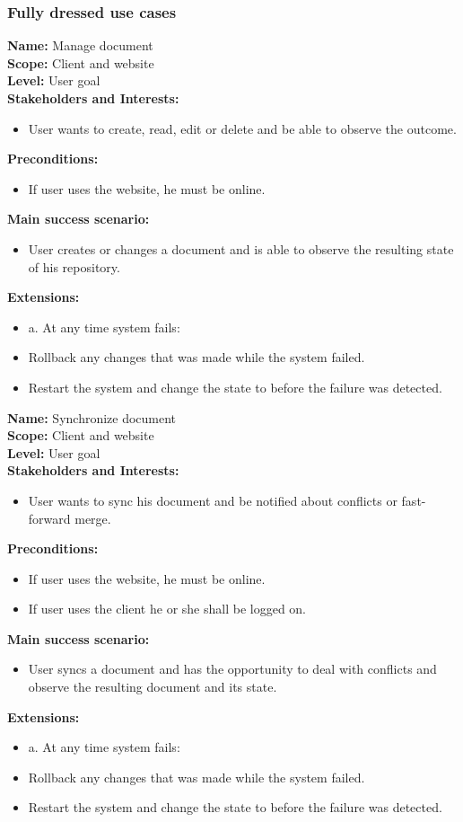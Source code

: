 \documentclass[a4paper,11pt,report]{report}
\begin{document}
	\subsubsection{Fully dressed use cases}
\textbf{Name:} Manage document \\
\textbf{Scope:} Client and website \\
\textbf{Level:} User goal \\
\textbf{Stakeholders and Interests:}
\begin{itemize}
	\item User wants to create, read, edit or delete and be able to observe the outcome.
\end{itemize} 
\textbf{Preconditions:}
\begin{itemize}
	\item If user uses the website, he must be online.
\end{itemize} 
\textbf{Main success scenario:}
\begin{itemize}
	\item User creates or changes a document and is able to observe the resulting state of his repository.
\end{itemize} 
\textbf{Extensions:}
\begin{itemize}
	\item a. At any time system fails:
	\item Rollback any changes that was made while the system failed.
	\item Restart the system and change the state to before the failure was detected.
\end{itemize} 

\textbf{Name:} Synchronize document \\
\textbf{Scope:} Client and website \\
\textbf{Level:} User goal \\
\textbf{Stakeholders and Interests:}
\begin{itemize}
	\item User wants to sync his document and be notified about conflicts or fast-forward merge.
\end{itemize} 
\textbf{Preconditions:}
\begin{itemize}
	\item If user uses the website, he must be online.
	\item If user uses the client he or she shall be logged on.
\end{itemize} 
\textbf{Main success scenario:}
\begin{itemize}
	\item User syncs a document and has the opportunity to deal with conflicts and observe the resulting document and its state.
\end{itemize} 
\textbf{Extensions:}
\begin{itemize}
	\item a. At any time system fails:
	\item Rollback any changes that was made while the system failed.
	\item Restart the system and change the state to before the failure was detected.
\end{itemize} 
\end{document}
